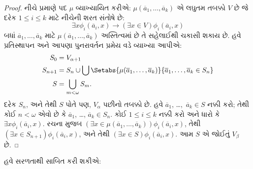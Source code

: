 \begin{proof}
નીચે પ્રમાણે પદ $\mu$ વ્યાખ્યાયિત કરીએ:
$\mu(\overline{a}_1, \ldots,
\overline{a}_k)$ એ લઘુતમ તબક્કો $V$ છે જે દરેક
$1 \leq i \leq k$ માટે નીચેની શરત સંતોષે છે:
\[
\exists x\phi_i(\overline{a}_i, x) \rightarrow (\exists x \in V) \phi_i(\overline{a}_i, x)
\]
બધાં $\overline{a}_1, \ldots, \overline{a}_k$
માટે $\mu(\overline{a}_1, \ldots, \overline{a}_k)$
અસ્તિત્વમાં છે તે સહેલાઈથી ચકાસી શકાય છે. હવે
પ્રતિસ્થાપન અને આપણા પુનરાવર્તન પ્રમેય વડે વ્યાખ્યા આપીએ:
\begin{align*}
	S_0 & = V_{\alpha+1}\\
	S_{n+1} & = S_n \cup \bigcup
	\Setabs{\mu(\overline{a}_1, \ldots, \overline{a}_k)}
	{\overline{a}_1, \ldots, \overline{a}_k \in S_n} \\
	S &= \bigcup_{m < \omega} S_m.
\end{align*}
દરેક $S_n$, અને તેથી $S$ પોતે પણ, $V_\alpha$
પછીનો તબક્કો છે. હવે $\overline{a}_1$,
\dots,~$\overline{a}_k \in S$ નક્કી કરો; તેથી કોઈ
$n < \omega$ એવો છે કે $\overline{a}_1$,
\dots, $\overline{a}_k \in S_n$. કોઈ
$1 \leq i \leq k$ નક્કી કરો અને ધારો કે
$\exists x \phi_i(\overline{a}_i,x)$. રચના મુજબ
$(\exists x \in \mu(\overline{a}_1,
\ldots, \overline{a}_k))\phi_i(\overline{a}_i, x)$,
તેથી $(\exists x \in S_{n+1})\phi_i(\overline{a}_i, x)$,
અને તેથી $(\exists x \in S)\phi_i(\overline{a}_i, x)$.
આમ $S$ એ જોઈતું $V_\beta$ છે.
\end{proof}
\noindent
હવે  સરળતાથી
સાબિત કરી શકીએ:

